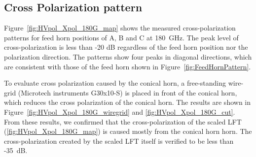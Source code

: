 \documentclass[journal]{IEEEtran}
\begin{document}
\subsection{Cross Polarization pattern}
%
Figure~\ref{fig:HVpol_Xpol_180G_map} shows the measured cross-polarization patterns for feed horn positions of A, B and C at 180~GHz. The peak level of cross-polarization is less than -20 dB regardless of the feed horn position nor the polarization direction. The patterns show four peaks in diagonal directions, which are consistent with those of the feed horn shown in Figure~\ref{fig:FeedHornPattern}.
\par
To evaluate cross polarization caused by the conical horn, a free-standing wire-grid (Microtech instruments G30x10-S) is placed in front of the conical horn, which reduces the cross polarization of the conical horn.
The results are shown in Figure~\ref{fig:HVpol_Xpol_180G_wiregrid} and \ref{fig:HVpol_Xpol_180G_cut}. 
From these results, we confirmed that the cross-polarization of the scaled LFT (\ref{fig:HVpol_Xpol_180G_map}) is caused mostly from the conical horn horn.
The cross-polarization created by the scaled LFT itself is verified to be less than -35~dB.
%
\end{document}
